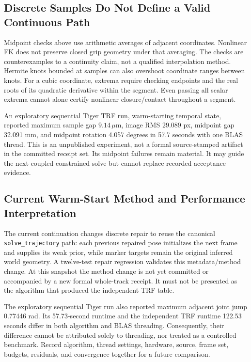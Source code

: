 \documentclass[11pt,letterpaper]{article}
\newcommand{\code}[1]{\nolinkurl{#1}}
\begin{document}
\subsection{Discrete Samples Do Not Define a Valid Continuous Path}
Midpoint checks above use arithmetic averages of adjacent coordinates.
Nonlinear FK does not preserve closed grip geometry under that averaging.
The checks are counterexamples to a continuity claim, not a qualified
interpolation method. Hermite knots bounded at samples can also overshoot
coordinate ranges between knots. For a cubic coordinate, extrema require
checking endpoints and the real roots of its quadratic derivative within the
segment. Even passing all scalar extrema cannot alone certify nonlinear
closure/contact throughout a segment.

An exploratory sequential Tiger TRF run, warm-starting temporal state, reported
maximum sample gap $9.14\,\mu$m, image RMS 29.089 px, midpoint gap 32.091 mm,
and midpoint rotation 4.057 degrees in 57.7 seconds with one BLAS thread.
This is an unpublished experiment, not a formal source-stamped artifact in the
committed receipt set. Its midpoint failures remain material. It may guide the
next coupled constrained solve but cannot replace recorded acceptance evidence.

\subsection{Current Warm-Start Method and Performance Interpretation}
The current continuation changes discrete repair to reuse the canonical
\code{solve_trajectory} path: each previous repaired pose initializes the next
frame and supplies its weak prior, while marker targets remain the original
inferred world geometry. A twelve-test repair regression validates this
metadata/method change. At this snapshot the method change is not yet committed
or accompanied by a new formal whole-track receipt. It must not be presented
as the algorithm that produced the independent TRF table.

The exploratory sequential Tiger run also reported maximum adjacent joint
jump 0.77446 rad. Its 57.73-second runtime and the independent TRF runtime
122.53 seconds differ in both algorithm and BLAS threading. Consequently,
their difference cannot be attributed solely to threading, nor treated as a
controlled benchmark. Record algorithm, thread settings, hardware, source,
frame set, budgets, residuals, and convergence together for a future comparison.
\end{document}
